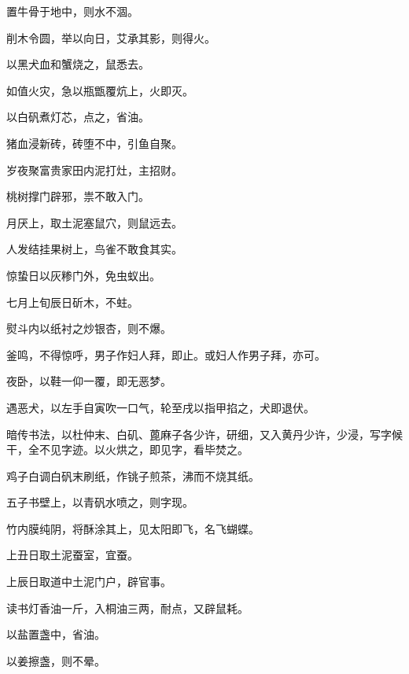 \documentclass[a4paper,12pt,UTF8,twoside]{ctexbook}
\begin{document}
    置牛骨于地中，则水不涸。
    
    削木令圆，举以向日，艾承其影，则得火。
    
    以黑犬血和蟹烧之，鼠悉去。
    
    如值火灾，急以瓶甑覆炕上，火即灭。
    
    以白矾煮灯芯，点之，省油。
    
    猪血浸新砖，砖堕不中，引鱼自聚。
    
    岁夜聚富贵家田内泥打灶，主招财。
    
    桃树撑门辟邪，祟不敢入门。
    
    月厌上，取土泥塞鼠穴，则鼠远去。
    
    人发结挂果树上，鸟雀不敢食其实。
    
    惊蛰日以灰糁门外，免虫蚁出。
    
    七月上旬辰日斫木，不蛀。
    
    熨斗内以纸衬之炒银杏，则不爆。
    
    釜鸣，不得惊呼，男子作妇人拜，即止。或妇人作男子拜，亦可。
    
    夜卧，以鞋一仰一覆，即无恶梦。
    
    遇恶犬，以左手自寅吹一口气，轮至戌以指甲掐之，犬即退伏。
    
    暗传书法，以杜仲末、白矶、蓖麻子各少许，研细，又入黄丹少许，少浸，写字候干，全不见字迹。以火烘之，即见字，看毕焚之。
    
    鸡子白调白矾末刷纸，作铫子煎茶，沸而不烧其纸。
    
    五子书壁上，以青矾水喷之，则字现。
    
    竹内膜纯阴，将酥涂其上，见太阳即飞，名飞蝴蝶。
    
    上丑日取土泥蚕室，宜蚕。
    
    上辰日取道中土泥门户，辟官事。
    
    读书灯香油一斤，入桐油三两，耐点，又辟鼠耗。
    
    以盐置盏中，省油。
    
    以姜擦盏，则不晕。
    
\end{document}
